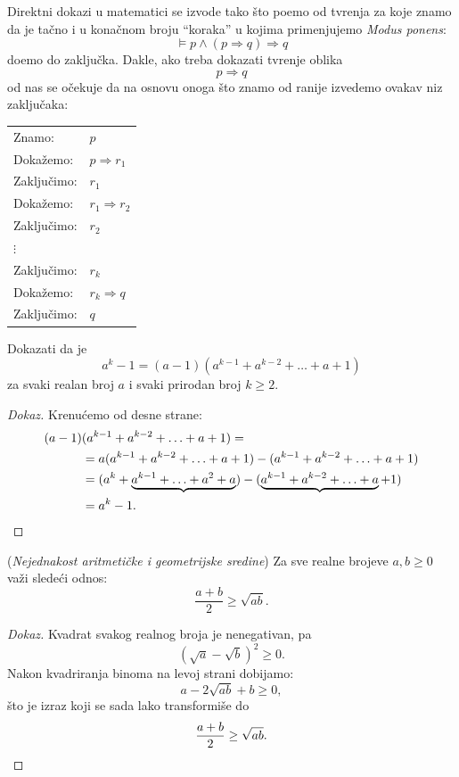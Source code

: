 Direktni dokazi u matematici se izvode tako \v sto po\dj emo od tvr\dj enja za koje znamo da je ta\v cno
i u kona\v cnom broju ``koraka'' u kojima primenjujemo \emph{Modus ponens}:
$$
  \vDash p \land (p \Rightarrow q) \Rightarrow q
$$
do\dj emo do zaklju\v cka. Dakle, ako treba dokazati tvr\dj enje oblika
$$
  p \Rightarrow q
$$
od nas se o\v cekuje da na osnovu onoga \v sto znamo od ranije izvedemo ovakav niz zaklju\v caka:
\begin{center}
  \begin{tabular}{ll}
    Znamo:                & $p$\\
    Doka\v zemo:          & $p \Rightarrow r_1$\\
    Zaklju\v cimo:        & $r_1$\\
    Doka\v zemo:          & $r_1 \Rightarrow r_2$\\
    Zaklju\v cimo:        & $r_2$\\
    \qquad $\vdots$\\
    Zaklju\v cimo:        & $r_k$\\
    Doka\v zemo:          & $r_k \Rightarrow q$\\
    Zaklju\v cimo:        & $q$
  \end{tabular}
\end{center}


\begin{EX}
  Dokazati da je
  $$
    a^k - 1 = (a - 1)(a^{k-1} + a^{k-2} + \ldots + a + 1)
  $$
  za svaki realan broj $a$ i svaki prirodan broj $k \ge 2$.
\end{EX}
\begin{proof}[Dokaz]
  Krenu\'cemo od desne strane:
  \begin{align*}
    (a - 1)&(a^{k-1} + a^{k-2} + \ldots + a + 1) =\\
          &= a(a^{k-1} + a^{k-2} + \ldots + a + 1) - (a^{k-1} + a^{k-2} + \ldots + a + 1)\\
          &= (a^{k} + \underbrace{a^{k-1} + \ldots + a^2 + a}) - (\underbrace{a^{k-1} + a^{k-2} + \ldots + a} + 1)\\
          &= a^k - 1.\qedhere
  \end{align*}
\end{proof}


\begin{EX}\label{ft05.ex.a-g-sredina} (\emph{Nejednakost aritmeti\v cke i geometrijske sredine})
  Za sve realne brojeve $a, b \ge 0$ va\v zi slede\'ci odnos:
  $$
    \frac{a + b}{2} \ge \sqrt{ab}.
  $$
\end{EX}
\begin{proof}[Dokaz]
  Kvadrat svakog realnog broja je nenegativan, pa
  $$
    (\sqrt a - \sqrt b)^2 \ge 0.
  $$
  Nakon kvadriranja binoma na levoj strani dobijamo:
  $$
    a - 2 \sqrt{ab} + b \ge 0,
  $$
  \v sto je izraz koji se sada lako transformi\v se do
  $$
    \frac{a + b}{2} \ge \sqrt{ab}.\qedhere
  $$
\end{proof}

